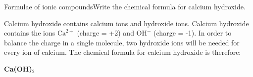 \begin{wex}{Formulae of ionic compounds}{Write the chemical formula for calcium hydroxide.\\}
{
Calcium hydroxide contains calcium ions and hydroxide ions.
Calcium hydroxide contains the ions $\mathrm{Ca}^{2+}$ (charge = +2) and $\mathrm{OH}^{-}$ (charge = -1). In order to balance the charge in a single molecule, two hydroxide ions will be needed for every ion of calcium. 
The chemical formula for calcium hydroxide is therefore: 

\begin{center}
\textbf{Ca(OH)$_2$}
\end{center}}
\end{wex}
    \noindent
\label{m38689*eip-682}
	\par
      \label{m38689*secfhsst!!!underscore!!!id822}
